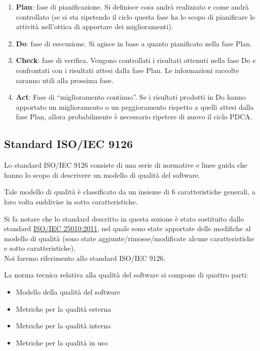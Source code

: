			\begin{enumerate}
			
				\item \textbf{Plan}: fase di pianificazione. Si definisce cosa andrà realizzato e come andrà controllato (se si sta ripetendo il ciclo questa fase ha lo scopo di pianificare le attività nell'ottica di apportare dei miglioramenti).
				\item \textbf{Do}: fase di esecuzione. Si agisce in base a quanto pianificato nella fase Plan.
				\item \textbf{Check}: fase di verifica. Vengono controllati i risultati ottenuti nella fase Do e confrontati con i risultati attesi dalla fase Plan. Le informazioni raccolte saranno utili alla prossima fase.
				\item \textbf{Act}: Fase di “miglioramento continuo”. Se i risultati prodotti in Do hanno apportato un miglioramento o un peggioramento rispetto a quelli attesi dalla fase Plan, allora probabilmente è necessario ripetere di nuovo il ciclo PDCA.
				
			\end{enumerate}

	\subsection{Standard ISO/IEC 9126}
	
		Lo standard ISO/IEC 9126 consiste di una serie di normative e linee guida che hanno lo scopo di descrivere un modello di qualità del software. 
		
		Tale modello di qualità è classificato da un insieme di 6 caratteristiche generali, a loro volta suddivise in sotto caratteristiche.
		
		Si fa notare che lo standard descritto in questa sezione è stato sostituito dallo standard \href{http://www.iso.org/iso/iso_catalogue/catalogue_tc/catalogue_detail.htm?csnumber=35733}{ISO/IEC 25010:2011}, nel quale sono state apportate delle modifiche al modello di qualità (sono state aggiunte/rimosse/modificate alcune caratteristiche e sotto caratteristiche).\\
		Noi faremo riferimento allo standard ISO/IEC 9126.
		
		La norma tecnica relativa alla qualità del software si compone di quattro parti:
		\begin{itemize}
		
			\item Modello della qualità del software
			\item Metriche per la qualità esterna
			\item Metriche per la qualità interna
			\item Metriche per la qualità in uso
			
		\end{itemize}
		
